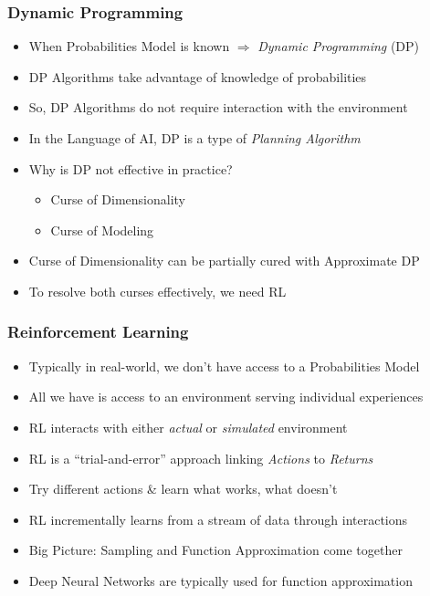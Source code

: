 \documentclass{beamer}
\begin{document}
\begin{frame}
\frametitle{Dynamic Programming}
\pause
\begin{itemize}[<+->]
\item When Probabilities Model is known $\Rightarrow$ {\em Dynamic Programming} (DP)
\item DP Algorithms take advantage of knowledge of probabilities
\item So, DP Algorithms do not require interaction with the environment
\item In the Language of AI, DP is a type of {\em Planning Algorithm}
\item Why is DP not effective in practice?
\pause
\begin{itemize}[<+->]
\item Curse of Dimensionality
\item Curse of Modeling
\end{itemize}
\item Curse of Dimensionality can be partially cured with Approximate DP
\item To resolve both curses effectively, we need RL
\end{itemize}
\end{frame}

\begin{frame}
\frametitle{Reinforcement Learning}
\pause
\begin{itemize}[<+->]
\item Typically in real-world, we don't have access to a Probabilities Model
\item All we have is access to an environment serving individual experiences
\item RL interacts with either {\em actual} or {\em simulated} environment
\item RL is a ``trial-and-error'' approach linking {\em Actions} to {\em Returns}
\item Try different actions \& learn what works, what doesn't
\item RL incrementally learns from a stream of data through interactions
\item Big Picture: Sampling and Function Approximation come together
\item Deep Neural Networks are typically used for function approximation
\end{itemize}
\end{frame}
\end{document}

